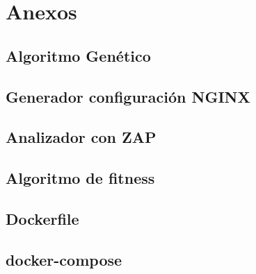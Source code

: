\chapter{Anexos}

\section{Algoritmo Genético}


\section{Generador configuración NGINX}


\section{Analizador con ZAP}


\section{Algoritmo de fitness}


\newpage
\section{Dockerfile}


\section{docker-compose}


